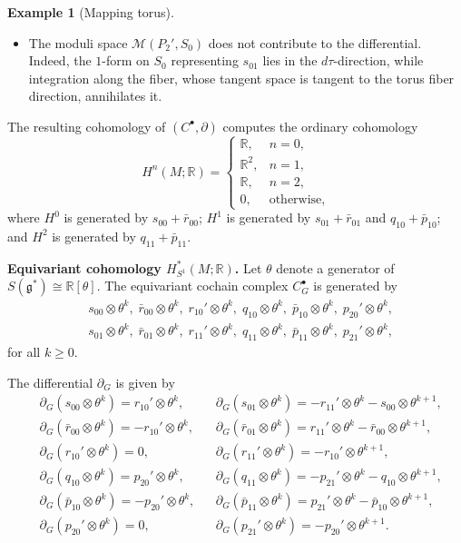 \documentclass[11pt]{amsart}
\theoremstyle{definition}
\newtheorem{example}[theorem]{Example}
\numberwithin{equation}{subsection}
\newcommand{\R}{\mathbb{R}}
\newcommand{\p}{\partial}
\newcommand{\g}{\mathfrak{g}}
\begin{document}
\begin{example}[Mapping torus]
\begin{itemize}
  \item The moduli space $\mathcal{M}(P_2',S_0)$ does not contribute to the 
  differential. Indeed, the $1$-form on $S_0$ representing $s_{01}$ lies in the 
  $d\tau$-direction, while integration along the fiber, whose tangent space is 
  tangent to the torus fiber direction, annihilates it.
\end{itemize}
 The resulting cohomology of $(C^\bullet,\partial)$ computes the ordinary cohomology
\[
H^n(M;\mathbb{R}) =
\begin{cases}
\mathbb{R}, & n=0,\\
\mathbb{R}^2, & n=1,\\
\mathbb{R}, & n=2,\\
0, & \text{otherwise},
\end{cases}
\]
where $H^0$ is generated by $s_{00}+\bar r_{00}$; $H^1$ is generated by 
$s_{01}+\bar r_{01}$ and $q_{10}+\bar p_{10}$; and $H^2$ is generated by $q_{11}+\bar p_{11}$.

\medskip
\noindent\textbf{Equivariant cohomology $H_{S^1}^*(M;\R)$.}
Let $\theta$ denote a generator of $S(\g^*) \cong \R[\theta]$. The equivariant cochain complex $C_G^\bullet$ is generated by
\begin{align*}
& s_{00} \otimes \theta^k,\;
\bar{r}_{00} \otimes \theta^k,\;
r_{10}' \otimes \theta^k,\;
q_{10} \otimes \theta^k,\;
\bar{p}_{10} \otimes \theta^k,\;
p_{20}' \otimes \theta^k, \\
& s_{01} \otimes \theta^k,\;
\bar{r}_{01} \otimes \theta^k,\;
r_{11}' \otimes \theta^k,\;
q_{11} \otimes \theta^k,\;
\bar{p}_{11} \otimes \theta^k,\;
p_{21}' \otimes \theta^k,
\end{align*}
for all $k \ge 0$.

The differential $\p_G$ is given by
\begin{align*}
& \p_G(s_{00} \otimes \theta^k)       =  r_{10}' \otimes \theta^k, &
& \p_G(s_{01} \otimes \theta^k)       = - r_{11}' \otimes \theta^k - s_{00} \otimes \theta^{k+1}, \\[0.5ex]
& \p_G(\bar{r}_{00} \otimes \theta^k) =  -r_{10}' \otimes \theta^k, &
& \p_G(\bar{r}_{01} \otimes \theta^k) =  r_{11}' \otimes \theta^k - \bar{r}_{00} \otimes \theta^{k+1}, \\[0.5ex]
& \p_G(r_{10}' \otimes \theta^k)  = 0, &
& \p_G(r_{11}' \otimes \theta^k)  = - r_{10}' \otimes \theta^{k+1}, \\[0.5ex]
& \p_G(q_{10} \otimes \theta^k)   =  p_{20}' \otimes \theta^k, &
& \p_G(q_{11} \otimes \theta^k)   =  -p_{21}' \otimes \theta^k - q_{10} \otimes \theta^{k+1}, \\[0.5ex]
& \p_G(\bar{p}_{10} \otimes \theta^k)  =  -p_{20}' \otimes \theta^k, &
& \p_G(\bar{p}_{11} \otimes \theta^k)  =  p_{21}' \otimes \theta^k - \bar{p}_{10} \otimes \theta^{k+1}, \\[0.5ex]
& \p_G(p_{20}' \otimes \theta^k)      = 0, &
& \p_G(p_{21}' \otimes \theta^k)      = - p_{20}' \otimes \theta^{k+1}.
\end{align*}


\end{example}
\end{document}
